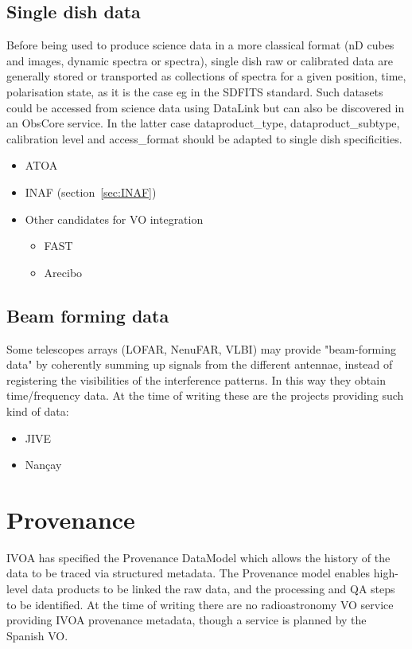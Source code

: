 \documentclass[11pt,a4paper]{ivoatex/ivoa}
\begin{document}
\subsection{Single dish data}
Before being used to produce science data in a more classical format (nD cubes and images, dynamic
spectra or spectra),  single dish  raw or calibrated data are generally stored or transported as 
collections of spectra for a given position, time, polarisation state, as it is the case eg in the 
SDFITS standard. Such datasets could be accessed from science data using DataLink but can also be 
discovered in an ObsCore service. In the latter case dataproduct\_type, dataproduct\_subtype, 
calibration level and access\_format should be adapted to single dish specificities.
\begin{itemize}
\item ATOA 
\item INAF (section~\ref{sec:INAF})
\item Other candidates for VO integration
\begin{itemize}
\item  FAST
\item Arecibo
\end{itemize}
\end{itemize}
\subsection{Beam forming data}
Some telescopes arrays (LOFAR, NenuFAR, VLBI) may provide "beam-forming data" by coherently summing up 
signals from the different antennae, instead of registering the visibilities of the interference 
patterns. In this way they obtain time/frequency data. At the time of writing these are the projects 
providing such kind of data:
\begin{itemize}
\item JIVE
\item Nan\c cay
\end{itemize}
\section{Provenance}

IVOA has specified the Provenance DataModel \citep{2020ivoa.spec.0411S} which allows the history of the 
data to be traced via structured metadata. The Provenance model enables high-level data products to be 
linked the raw data, and the processing and QA steps to be identified. At the time of writing there are 
no radioastronomy VO service providing IVOA provenance metadata, though a service is planned by the 
Spanish VO.   
\end{document}

